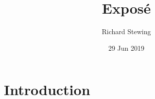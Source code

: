 \documentclass[11pt]{article}
\author{Richard Stewing}
\date{29 Jun 2019}
\title{Exposé}
\begin{document}
\maketitle

\section{Introduction}
\label{sec:org357605d}
\end{document}
